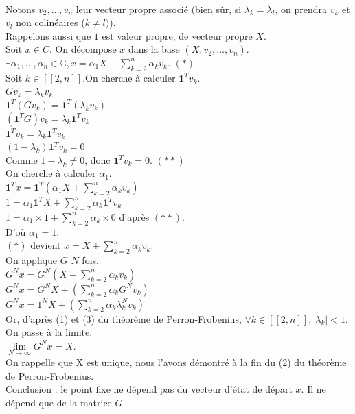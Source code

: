 \documentclass{article}
\begin{document}
\\Notons $v_2,\dots,v_n$ leur vecteur propre associé (bien sûr, si $\lambda_k=\lambda_l$, on prendra $v_k$ et $v_l$ non colinéaires ($k\neq l)$).
\\Rappelons aussi que $1$ est valeur propre, de vecteur propre $X$.
\\Soit $x \in C$. On décompose $x$ dans la base $(X,v_2,\dots,v_n)$.
\\$\exists \alpha_1,\dots,\alpha_n\in\mathbb{C},x=\alpha_1X+\sum\limits_{k=2}^n \alpha_kv_k$. $(*)$
\\Soit $k\in[\![2,n]\!]$.On cherche à calculer $\textbf{1}^Tv_k$.
\\$Gv_k=\lambda_kv_k$
\\$\textbf{1}^T(Gv_k)=\textbf{1}^T(\lambda_kv_k)$
\\$(\textbf{1}^TG)v_k=\lambda_k\textbf{1}^Tv_k$
\\$\textbf{1}^Tv_k=\lambda_k\textbf{1}^Tv_k$
\\$(1-\lambda_k)\textbf{1}^Tv_k=0$
\\Comme $1-\lambda_k\neq0$, donc $\textbf{1}^Tv_k=0$. $(**)$
\\On cherche à calculer $\alpha_1$.
\\$\textbf{1}^Tx=\textbf{1}^T\left(\alpha_1X+\sum\limits_{k=2}^n \alpha_kv_k\right)$
\\$1=\alpha_1\textbf{1}^TX+\sum\limits_{k=2}^n\alpha_k\textbf{1}^Tv_k$
\\$1=\alpha_1\times1+\sum\limits_{k=2}^n\alpha_k\times0$ d'après $(**)$.
\\D'où $\alpha_1=1$.
\\$(*)$ devient $x=X+\sum\limits_{k=2}^n \alpha_kv_k$.
\\On applique $G$ $N$ fois.
\\$G^Nx=G^N\left(X+\sum\limits_{k=2}^n \alpha_kv_k\right)$
\\$G^Nx=G^NX+\left(\sum\limits_{k=2}^n \alpha_kG^Nv_k\right)$
\\$G^Nx=1^NX+\left(\sum\limits_{k=2}^n \alpha_k\lambda_k^Nv_k\right)$
\\Or, d'après (1) et (3) du théorème de Perron-Frobenius, $\forall k\in[\![2,n]\!],|\lambda_k|<1$.
\\On passe à la limite.
\\$\lim\limits_{N\to\infty}G^Nx=X$.
\\On rappelle que X est unique, nous l'avons démontré à la fin du (2) du théorème de Perron-Frobenius.
\\Conclusion : le point fixe ne dépend pas du vecteur d'état de départ $x$. Il ne dépend que de la matrice $G$.
\end{document}

